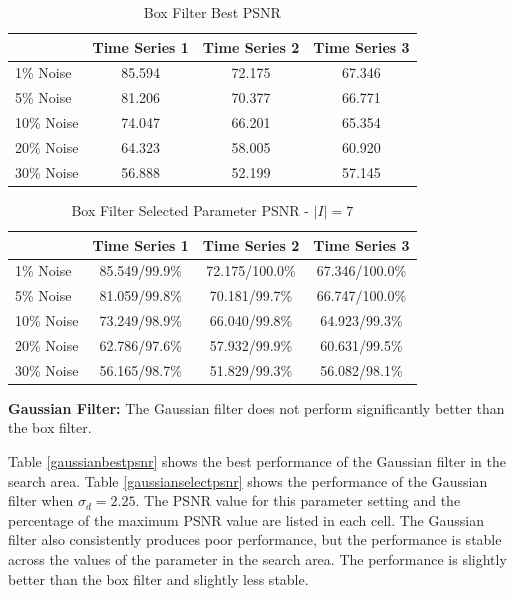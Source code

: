 \documentclass[11pt]{article}
\newcommand{\vs}{\vspace{0.1in}}
\theoremstyle{definition}
\begin{document}
\begin{table}[!h]
\small
\begin{center}
\begin{tabular}{l | c | c | c}
 & Time Series 1 & Time Series 2 & Time Series 3 \\ \hline
1\% Noise & 85.594 & 72.175 & 67.346 \\ \hline
5\% Noise & 81.206 & 70.377 & 66.771 \\ \hline
10\% Noise & 74.047 & 66.201 & 65.354 \\ \hline
20\% Noise & 64.323 & 58.005 & 60.920 \\ \hline
30\% Noise & 56.888 & 52.199 & 57.145
\end{tabular}
\caption{Box Filter Best PSNR}
\label{boxbestpsnr}
\end{center}
\end{table}

\begin{table}[!h]
\small
\begin{center}
\begin{tabular}{l | c | c | c}
 & Time Series 1 & Time Series 2 & Time Series 3 \\ \hline
1\% Noise & 85.549/99.9\% & 72.175/100.0\% & 67.346/100.0\% \\ \hline
5\% Noise & 81.059/99.8\% & 70.181/99.7\% & 66.747/100.0\% \\ \hline
10\% Noise & 73.249/98.9\% & 66.040/99.8\% & 64.923/99.3\% \\ \hline
20\% Noise & 62.786/97.6\% & 57.932/99.9\% & 60.631/99.5\% \\ \hline
30\% Noise & 56.165/98.7\% & 51.829/99.3\% & 56.082/98.1\%
\end{tabular}
\caption{Box Filter Selected Parameter PSNR - $\lvert I \rvert = 7$}
\label{boxselectpsnr}
\end{center}
\end{table}

\vs
\noindent
\textbf{Gaussian Filter:} The Gaussian filter does not perform significantly better than the box filter.

Table \ref{gaussianbestpsnr} shows the best performance of the Gaussian filter in the search area. Table \ref{gaussianselectpsnr} shows the performance of the Gaussian filter when $\sigma_d = 2.25$. The PSNR value for this parameter setting and the percentage of the maximum PSNR value are listed in each cell. The Gaussian filter also consistently produces poor performance, but the performance is stable across the values of the parameter in the search area. The performance is slightly better than the box filter and slightly less stable.
\end{document}
